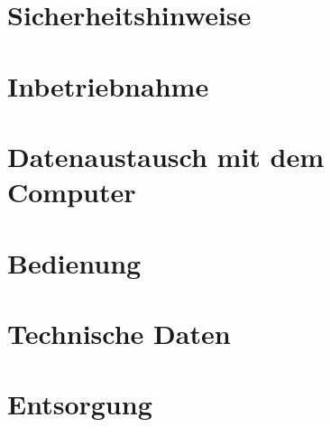 \documentclass[10pt,a5paper,landscape]{article}
\begin{document}
\section{Sicherheitshinweise}\label{sec:Sicherheitshinweise}

\clearpage

\section{Inbetriebnahme}\label{sec:Inbetriebnahme}

\clearpage

\section{Datenaustausch mit dem Computer}\label{sec:Datenaustausch mit dem Computer}

\clearpage

\section{Bedienung}\label{sec:Bedienung}

\clearpage

\section{Technische Daten}\label{sec:Technische Daten}

\clearpage

\section{Entsorgung}\label{sec:Entsorgung}

\clearpage
\end{document}
